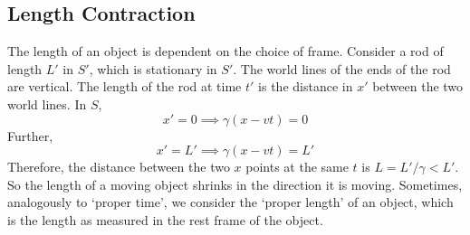 \documentclass{article}
\begin{document}
\subsection{Length Contraction}
The length of an object is dependent on the choice of frame. Consider a rod of length $L'$ in $S'$, which is stationary in $S'$. The world lines of the ends of the rod are vertical. The length of the rod at time $t'$ is the distance in $x'$ between the two world lines. In $S$,
\[ x' = 0 \implies \gamma(x - vt) = 0 \]
Further,
\[ x' = L' \implies \gamma(x - vt) = L' \]
Therefore, the distance between the two $x$ points at the same $t$ is $L = L'/\gamma < L'$. So the length of a moving object shrinks in the direction it is moving. Sometimes, analogously to `proper time', we consider the `proper length' of an object, which is the length as measured in the rest frame of the object.
\end{document}
